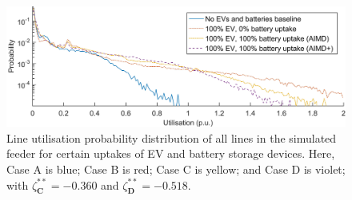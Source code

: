\begin{figure}[htb]\centering
 \includegraphics{_chapter1/fig/input/utilisation-excerpt}
 \caption{Line utilisation probability distribution of all lines in the simulated feeder for certain uptakes of EV and battery storage devices. Here, Case {A} is blue; Case {B} is red; Case {C} is yellow; and Case {D} is violet; with $\zeta_\textbf{C}^{**} = -0.360$ and $\zeta_\textbf{D}^{**} = -0.518$.}
 \label{ch1:fig:line-utilisation-excerpt}
\end{figure}
